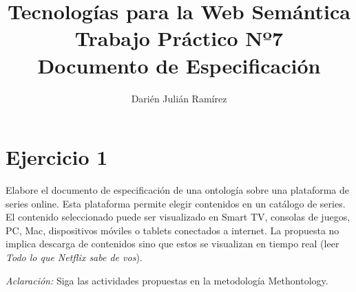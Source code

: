\documentclass[a4paper,10pt,twoside,final,spanish]{article}
\title{\Huge Tecnologías para la Web Semántica\\
			 Trabajo Práctico Nº7\\
			 Documento de Especificación}
\author{Darién Julián Ramírez}
\date{}
\begin{document}
\maketitle %

\section*{Ejercicio 1}

Elabore el documento de especificación de una ontología sobre una plataforma de series online. Esta plataforma permite elegir contenidos en un catálogo de series. El contenido seleccionado puede ser visualizado en Smart TV, consolas de juegos, PC, Mac, dispositivos móviles o tablets conectados a internet. La propuesta no implica descarga de contenidos sino que estos se visualizan en tiempo real (leer \textit{Todo lo que Netflix sabe de vos}).

\textit{Aclaración:} Siga las actividades propuestas en la metodología Methontology.\\


\dotfill
\end{document}
